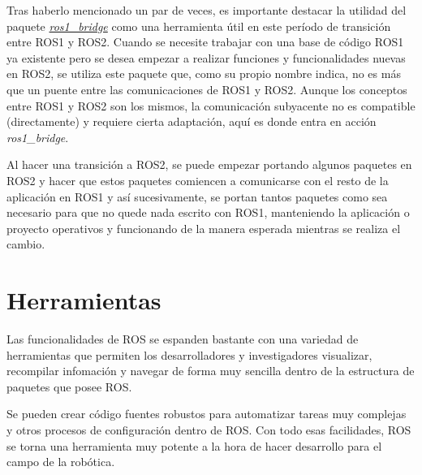 Tras haberlo mencionado un par de veces, es importante destacar la utilidad del paquete \href{https://github.com/ros2/ros1_bridge}{\textit{ros1\_bridge}} como una herramienta útil en este período de transición entre ROS1 y ROS2. Cuando se necesite trabajar con una base de código ROS1 ya existente pero se desea empezar a realizar funciones y funcionalidades nuevas en ROS2, se utiliza este paquete que, como su propio nombre indica, no es más que un puente entre las comunicaciones de ROS1 y ROS2. Aunque los conceptos entre ROS1 y ROS2 son los mismos, la comunicación subyacente no es compatible (directamente) y requiere cierta adaptación, aquí es donde entra en acción \textit{ros1\_bridge}.

Al hacer una transición a ROS2, se puede empezar portando algunos paquetes en ROS2 y hacer que estos paquetes comiencen a comunicarse con el resto de la aplicación en ROS1 y así sucesivamente, se portan tantos paquetes como sea necesario para que no quede nada escrito con ROS1, manteniendo la aplicación o proyecto operativos y funcionando de la manera esperada mientras se realiza el cambio.

\section{Herramientas}
Las funcionalidades de ROS se espanden bastante con una variedad de herramientas que permiten los desarrolladores y investigadores visualizar, recompilar infomación y navegar de forma muy sencilla dentro de la estructura de paquetes que posee ROS. 

Se pueden crear código fuentes robustos para automatizar tareas muy complejas y otros procesos de configuración dentro de ROS. Con todo esas facilidades, ROS se torna una herramienta muy potente a la hora de hacer desarrollo para el campo de la robótica. 

